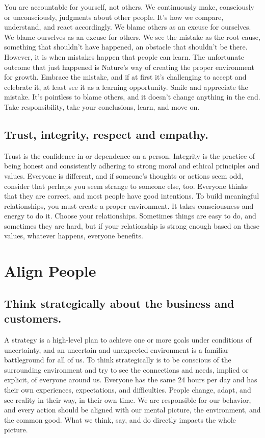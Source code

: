 \documentclass[10pt,a4paper]{book}
\begin{document}
You are accountable for yourself, not others. We continuously make, consciously or unconsciously, judgments about other people. It's how we compare, understand, and react accordingly. We blame others as an excuse for ourselves. We blame ourselves as an excuse for others. We see the mistake as the root cause, something that shouldn't have happened, an obstacle that shouldn't be there. However, it is when mistakes happen that people can learn. The unfortunate outcome that just happened is Nature's way of creating the proper environment for growth. Embrace the mistake, and if at first it's challenging to accept and celebrate it, at least see it as a learning opportunity. Smile and appreciate the mistake. It's pointless to blame others, and it doesn't change anything in the end. Take responsibility, take your conclusions, learn, and move on.

\section{Trust, integrity, respect and empathy.}

Trust is the confidence in or dependence on a person. Integrity is the practice of being honest and consistently adhering to strong moral and ethical principles and values. Everyone is different, and if someone's thoughts or actions seem odd, consider that perhaps you seem strange to someone else, too. Everyone thinks that they are correct, and most people have good intentions. To build meaningful relationships, you must create a proper environment. It takes consciousness and energy to do it. Choose your relationships. Sometimes things are easy to do, and sometimes they are hard, but if your relationship is strong enough based on these values, whatever happens, everyone benefits.

\chapter{Align People}

\section{Think strategically about the business and customers.}

A strategy is a high-level plan to achieve one or more goals under conditions of uncertainty, and an uncertain and unexpected environment is a familiar battleground for all of us. To think strategically is to be conscious of the surrounding environment and try to see the connections and needs, implied or explicit, of everyone around us. Everyone has the same 24 hours per day and has their own experiences, expectations, and difficulties. People change, adapt, and see reality in their way, in their own time. We are responsible for our behavior, and every action should be aligned with our mental picture, the environment, and the common good. What we think, say, and do directly impacts the whole picture.
\end{document}
